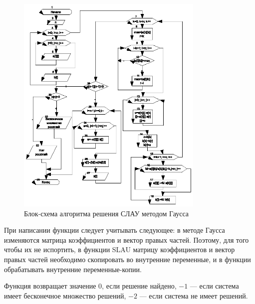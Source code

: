 \begin{figure}[htb]
\begin{center}
\includegraphics[width=0.8\textwidth]{img/ris_6_15}
\caption{Блок-схема алгоритма решения СЛАУ методом Гаусса}
\label{ch06:refDrawing14}
\end{center}
\end{figure}

При написании функции следует учитывать следующее: в методе Гаусса изменяются матрица коэффициентов и вектор правых
частей. Поэтому, для того чтобы их не испортить, в функции SLAU матрицу коэффициентов и вектор правых частей необходимо
скопировать во внутренние переменные, и в функции обрабатывать внутренние переменные-копии.

Функция  возвращает значение 0, если решение найдено, $-1$ --- если система имеет 
бесконечное множество решений, $-2$ --- если система не имеет решений.

